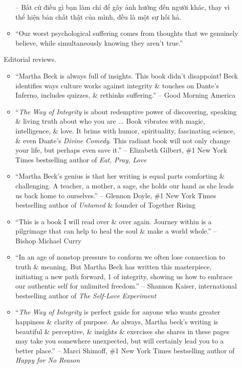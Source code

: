 \documentclass{article}
\begin{document}
\begin{enumerate}
\begin{itemize}
		-- Bất cứ điều gì bạn làm chỉ để gây ảnh hưởng đến người khác, thay vì thể hiện bản chất thật của mình, đều là một sự hối hả.
		\item ``Our worst psychological suffering comes from thoughts that we genuinely believe, while simultaneously knowing they aren't true.''
	\end{itemize}
	{\sf Editorial reviews.}
	\begin{itemize}
		\item ``{\sc Martha Beck} is always full of insights. This book didn't disappoint! {\sc Beck} identifies ways culture works against integrity \& touches on {\sc Dante}'s Inferno, includes quizzes, \& rethinks suffering.'' -- Good Morning America
		\item ``{\it The Way of Integrity} is about redemptive power of discovering, speaking \& living truth about who you are $\ldots$ Book vibrates with magic, intelligence, \& love. It brims with humor, spirituality, fascinating science, \& even {\sc Dante}'s {\it Divine Comedy}. This radiant book will not only change your life, but perhaps even save it.'' -- {\sc Elizabeth Gilbert}, \#1 New York Times bestselling author of {\it Eat, Pray, Love}
		\item ``{\sc Martha Beck}'s genius is that her writing is equal parts comforting \& challenging. A teacher, a mother, a sage, she holds our hand as she leads us back home to ourselves.'' -- {\sc Glennon Doyle}, \#1 New York Times bestselling author of {\it Untamed} \& founder of Together Rising
		\item ``This is a book I will read over \& over again. Journey within is a pilgrimage that can help to heal the soul \& make a world whole.'' -- {\sc Bishop Michael Curry}
		\item ``In an age of nonstop pressure to conform we often lose connection to truth \& meaning. But {\sc Martha Beck} has written this masterpiece, initiating a new path forward, 1 of integrity, showing us how to embrace our authentic self for unlimited freedom.'' -- {\sc Shannon Kaiser}, international bestselling author of {\it The Self-Love Experiment}
		\item ``{\it The Way of Integrity} is perfect guide for anyone who wants greater happiness \& clarity of purpose. As always, {\sc Martha beck}'s writing is beautiful \& perceptive, \& insights \& exercises she shares in these pages may take you somewhere unexpected, but will certainly lead you to a better place.'' -- {\sc Marci Shimoff}, \#1 New York Times bestselling author of {\it Happy for No Reason}

\end{itemize}
\end{enumerate}
\end{document}
